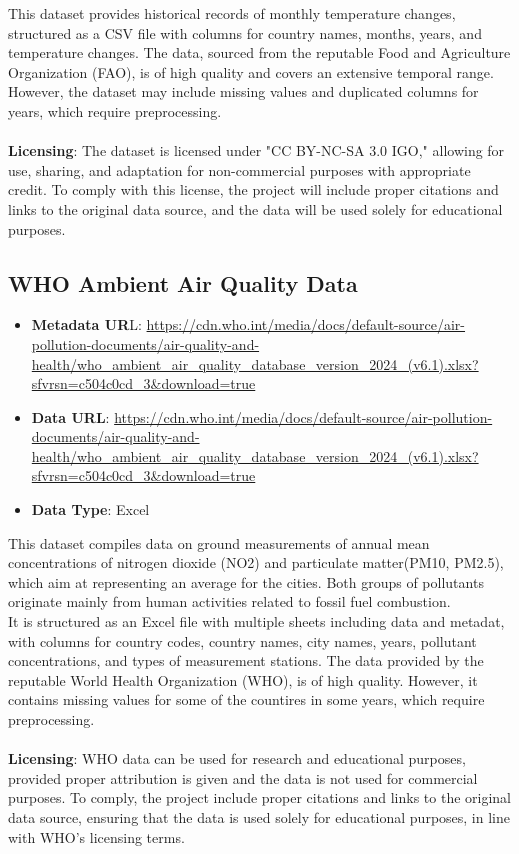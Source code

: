 \documentclass{article}
\begin{document}
This dataset provides historical records of monthly temperature changes, structured as a CSV file with columns for country names, months, years, and temperature changes. The data, sourced from the reputable Food and Agriculture Organization (FAO), is of high quality and covers an extensive temporal range. However, the dataset may include missing values and duplicated columns for years, which require preprocessing. \\\\
\textbf{Licensing}: The dataset is licensed under "CC BY-NC-SA 3.0 IGO," allowing for use, sharing, and adaptation for non-commercial purposes with appropriate credit. To comply with this license, the project will include proper citations and links to the original data source, and the data will be used solely for educational purposes.

\vspace{1em}
\subsection{WHO Ambient Air Quality Data}
\begin{itemize}
    \item \textbf{Metadata UR}L: \url{https://cdn.who.int/media/docs/default-source/air-pollution-documents/air-quality-and-health/who_ambient_air_quality_database_version_2024_(v6.1).xlsx?sfvrsn=c504c0cd_3&download=true}
    \item \textbf{Data URL}: \url{https://cdn.who.int/media/docs/default-source/air-pollution-documents/air-quality-and-health/who_ambient_air_quality_database_version_2024_(v6.1).xlsx?sfvrsn=c504c0cd_3&download=true}
    \item \textbf{Data Type}: Excel
\end{itemize}

This dataset compiles data on ground measurements of annual mean concentrations of nitrogen dioxide (NO2) and particulate matter(PM10, PM2.5), which aim at representing an average for the cities. Both groups of pollutants originate mainly from human activities related to fossil fuel combustion.\\
It is structured as an Excel file with multiple sheets including data and  metadat, with columns for country codes, country names, city names, years, pollutant concentrations, and types of measurement stations. 
The data provided by the reputable World Health Organization (WHO), is of high quality. However, it contains missing values for some of the countires in some years, which require preprocessing.\\\\
\textbf{Licensing}: WHO data can be used for research and educational purposes, provided proper attribution is given and the data is not used for commercial purposes. To comply, the project include proper citations and links to the original data source, ensuring that the data is used solely for educational purposes, in line with WHO’s licensing terms.
\end{document}
